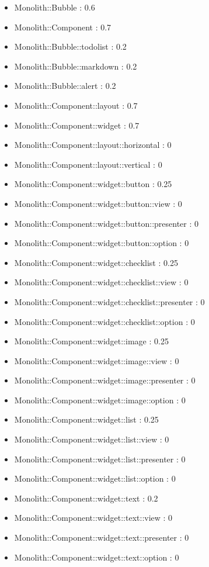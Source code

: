 \begin{itemize}
\item Monolith::Bubble : 0.6
\item Monolith::Component : 0.7
\item Monolith::Bubble::todolist : 0.2
\item Monolith::Bubble::markdown : 0.2
\item Monolith::Bubble::alert : 0.2
\item Monolith::Component::layout : 0.7
\item Monolith::Component::widget : 0.7
\item Monolith::Component::layout::horizontal : 0
\item Monolith::Component::layout::vertical : 0
\item Monolith::Component::widget::button : 0.25
\item Monolith::Component::widget::button::view : 0
\item Monolith::Component::widget::button::presenter : 0
\item Monolith::Component::widget::button::option : 0
\item Monolith::Component::widget::checklist : 0.25
\item Monolith::Component::widget::checklist::view : 0
\item Monolith::Component::widget::checklist::presenter : 0
\item Monolith::Component::widget::checklist::option : 0
\item Monolith::Component::widget::image : 0.25
\item Monolith::Component::widget::image::view : 0
\item Monolith::Component::widget::image::presenter : 0
\item Monolith::Component::widget::image::option : 0
\item Monolith::Component::widget::list : 0.25
\item Monolith::Component::widget::list::view : 0
\item Monolith::Component::widget::list::presenter : 0
\item Monolith::Component::widget::list::option : 0
\item Monolith::Component::widget::text : 0.2
\item Monolith::Component::widget::text::view : 0
\item Monolith::Component::widget::text::presenter : 0
\item Monolith::Component::widget::text::option : 0
\end{itemize}

